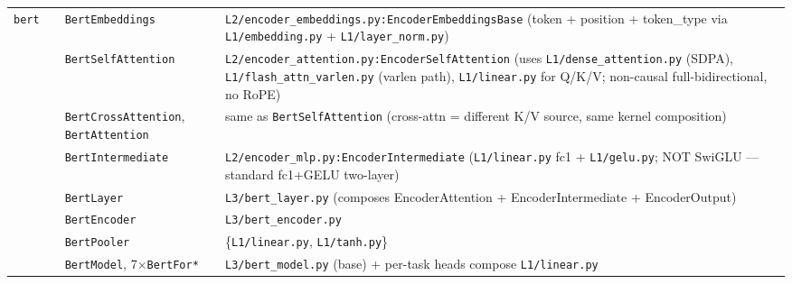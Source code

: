 \documentclass[10pt]{article}
\newcommand{\cmark}{\ding{51}}
\begin{document}
{\begin{longtable}{@{}p{1.6cm} c p{4.0cm} p{14.5cm}@{}}
\multirow{8}{*}{\texttt{bert}} & \multirow{8}{*}{\cmark}
   & \texttt{BertEmbeddings}          & \texttt{L2/encoder\_embeddings.py:EncoderEmbeddingsBase} (token + position + token\_type via \texttt{L1/embedding.py} + \texttt{L1/layer\_norm.py}) \\
&& \texttt{BertSelfAttention}         & \texttt{L2/encoder\_attention.py:EncoderSelfAttention} (uses \texttt{L1/dense\_attention.py} (SDPA), \texttt{L1/flash\_attn\_varlen.py} (varlen path), \texttt{L1/linear.py} for Q/K/V; non-causal full-bidirectional, no RoPE) \\
&& \texttt{BertCrossAttention}, \texttt{BertAttention} & same as \texttt{BertSelfAttention} (cross-attn = different K/V source, same kernel composition) \\
&& \texttt{BertIntermediate}          & \texttt{L2/encoder\_mlp.py:EncoderIntermediate} (\texttt{L1/linear.py} fc1 + \texttt{L1/gelu.py}; NOT SwiGLU --- standard fc1+GELU two-layer) \\
&& \texttt{BertLayer}                 & \texttt{L3/bert\_layer.py} (composes EncoderAttention + EncoderIntermediate + EncoderOutput) \\
&& \texttt{BertEncoder}               & \texttt{L3/bert\_encoder.py} \\
&& \texttt{BertPooler}                & \{\texttt{L1/linear.py}, \texttt{L1/tanh.py}\} \\
&& \texttt{BertModel}, 7$\times$\texttt{BertFor*} & \texttt{L3/bert\_model.py} (base) + per-task heads compose \texttt{L1/linear.py} \\
\midrule


\end{longtable}}
\end{document}
